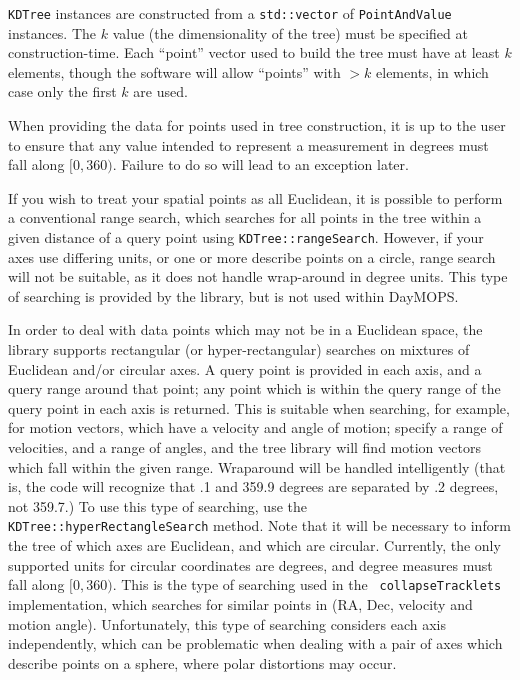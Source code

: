 {\tt KDTree} instances are constructed from a {\tt std::vector} of
{\tt PointAndValue} instances.  The $k$ value (the dimensionality of
the tree) must be specified at construction-time.  Each ``point''
vector used to build the tree must have at least $k$
elements, though the software will allow ``points'' with $>k$
elements, in which case only the first $k$ are used.  

When providing the data for points used in tree construction, it is up
to the user to ensure that any value intended to represent a
measurement in degrees must fall along $[0,360)$.  Failure to do so
will lead to an exception later.

If you wish to treat your spatial points as all Euclidean, it is
possible to perform a conventional range search, which searches for
all points in the tree within a given distance of a query point using
{\tt KDTree::rangeSearch}.  However, if your axes use differing units,
or one or more describe points on a circle, range search will not be
suitable, as it does not handle wrap-around in degree units.  This
type of searching is provided by the library, but is not used within
DayMOPS.

In order to deal with data points which may not be in a Euclidean
space, the library supports rectangular (or hyper-rectangular)
searches on mixtures of Euclidean and/or
circular axes.  A query point is provided in each axis, and a query
range around that point; any point which is within the query range
of the query point in each axis is returned.  This is suitable when
searching, for example, for motion vectors, which have a velocity and
angle of motion; specify a range of velocities, and a range of angles,
and the tree library will find motion vectors which fall within the
given range.  Wraparound will be handled intelligently (that is, the
code will recognize that .1 and 359.9 degrees are separated by .2
degrees, not 359.7.)  To use this type of searching, use the {\tt
KDTree::hyperRectangleSearch} method. Note that it will be necessary
to inform the tree of which axes are Euclidean, and which are
circular.  Currently, the only supported units for circular
coordinates are degrees, and degree measures must fall along $[0,
360)$.  This is the type of searching used in the {\tt
collapseTracklets} implementation, which searches for similar points
in (RA, Dec, velocity and motion angle).  Unfortunately, this type of
searching considers each axis independently, which can be problematic
when dealing with a pair of axes which describe points on a sphere,
where polar distortions may occur.  

